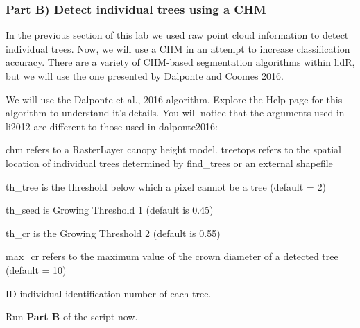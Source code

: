 \documentclass[
]{book}
\begin{document}
\hypertarget{part-b-detect-individual-trees-using-a-chm}{%
\subsubsection*{Part B) Detect individual trees using a CHM}\label{part-b-detect-individual-trees-using-a-chm}}

In the previous section of this lab we used raw point cloud information to detect individual trees. Now, we will use a CHM in an attempt to increase classification accuracy. There are a variety of CHM-based segmentation algorithms within lidR, but we will use the one presented by Dalponte and Coomes 2016.

We will use the Dalponte et al., 2016 algorithm. Explore the Help page for this algorithm to understand it's details. You will notice that the arguments used in li2012 are different to those used in dalponte2016:

chm refers to a RasterLayer canopy height model.
treetops refers to the spatial location of individual trees determined by find\_trees or an external shapefile

th\_tree is the threshold below which a pixel cannot be a tree (default = 2)

th\_seed is Growing Threshold 1 (default is 0.45)

th\_cr is the Growing Threshold 2 (default is 0.55)

max\_cr refers to the maximum value of the crown diameter of a detected tree (default = 10)

ID individual identification number of each tree.

Run \textbf{Part B} of the script now.
\end{document}
